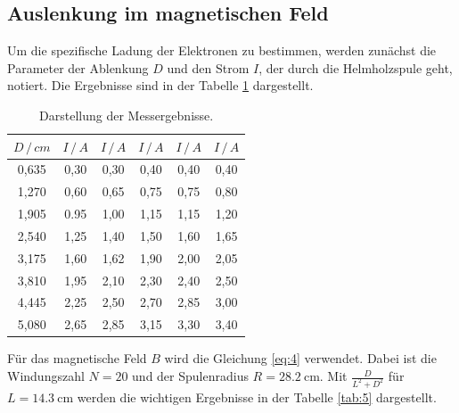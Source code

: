 \subsection{Auslenkung im magnetischen Feld}
Um die spezifische Ladung der Elektronen zu bestimmen, werden zunächst
die Parameter der Ablenkung $D$ und den Strom $I$, der durch die Helmholzspule geht,
notiert.
Die Ergebnisse sind in der Tabelle \ref{tab:4} dargestellt.
\begin{table}[H]
  \centering
  \caption{Darstellung der Messergebnisse.}
  \label{tab:4}
  \begin{tabular}{c c c c c c}
\toprule
$D \, / \, cm$ & $I \, / \, A$ & $I \, / \, A$ & $I \, / \, A$ &$I \, / \, A$ & $I \, / \, A$\\
\midrule
0,635 & 0,30  & 0,30 & 0,40 & 0,40& 0,40\\
1,270 & 0,60  & 0,65 & 0,75 & 0,75& 0,80\\
1,905 & 0.95  & 1,00 & 1,15 & 1,15& 1,20\\
2,540 & 1,25  & 1,40 & 1,50 & 1,60& 1,65\\
3,175 & 1,60  & 1,62 & 1,90 & 2,00& 2,05\\
3,810 & 1,95  & 2,10 & 2,30 & 2,40& 2,50\\
4,445 & 2,25  & 2,50 & 2,70 & 2,85& 3,00\\
5,080 & 2,65  & 2,85 & 3,15 & 3,30& 3,40\\
\bottomrule
  \end{tabular}
\end{table}
Für das magnetische Feld $B$ wird die Gleichung \ref{eq:4} verwendet. Dabei ist die
Windungszahl $N = 20 $ und der Spulenradius $R = \SI{28.2}{\centi\meter}$.
Mit $\frac{D}{L^2+D^2}$ für $L = \SI{14.3}{\centi\meter}$ werden die wichtigen
Ergebnisse in der Tabelle \ref{tab:5} dargestellt.
